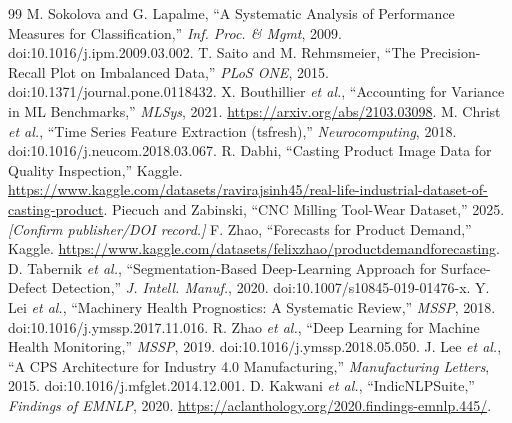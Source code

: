 \documentclass[12pt]{article}
\begin{document}
\begin{thebibliography}{99}
 M. Sokolova and G. Lapalme, ``A Systematic Analysis of Performance Measures for Classification,'' \emph{Inf. Proc. \& Mgmt}, 2009. doi:10.1016/j.ipm.2009.03.002.
 T. Saito and M. Rehmsmeier, ``The Precision-Recall Plot on Imbalanced Data,'' \emph{PLoS ONE}, 2015. doi:10.1371/journal.pone.0118432.
 X. Bouthillier \emph{et al.}, ``Accounting for Variance in ML Benchmarks,'' \emph{MLSys}, 2021. \url{https://arxiv.org/abs/2103.03098}.
 M. Christ \emph{et al.}, ``Time Series Feature Extraction (tsfresh),'' \emph{Neurocomputing}, 2018. doi:10.1016/j.neucom.2018.03.067.
 R. Dabhi, ``Casting Product Image Data for Quality Inspection,'' Kaggle. \url{https://www.kaggle.com/datasets/ravirajsinh45/real-life-industrial-dataset-of-casting-product}.
 Piecuch and Zabinski, ``CNC Milling Tool-Wear Dataset,'' 2025. \emph{[Confirm publisher/DOI record.]}
 F. Zhao, ``Forecasts for Product Demand,'' Kaggle. \url{https://www.kaggle.com/datasets/felixzhao/productdemandforecasting}.
 D. Tabernik \emph{et al.}, ``Segmentation-Based Deep-Learning Approach for Surface-Defect Detection,'' \emph{J. Intell. Manuf.}, 2020. doi:10.1007/s10845-019-01476-x.
 Y. Lei \emph{et al.}, ``Machinery Health Prognostics: A Systematic Review,'' \emph{MSSP}, 2018. doi:10.1016/j.ymssp.2017.11.016.
 R. Zhao \emph{et al.}, ``Deep Learning for Machine Health Monitoring,'' \emph{MSSP}, 2019. doi:10.1016/j.ymssp.2018.05.050.
 J. Lee \emph{et al.}, ``A CPS Architecture for Industry 4.0 Manufacturing,'' \emph{Manufacturing Letters}, 2015. doi:10.1016/j.mfglet.2014.12.001.
 D. Kakwani \emph{et al.}, ``IndicNLPSuite,'' \emph{Findings of EMNLP}, 2020. \url{https://aclanthology.org/2020.findings-emnlp.445/}.
\end{thebibliography}
\end{document}
